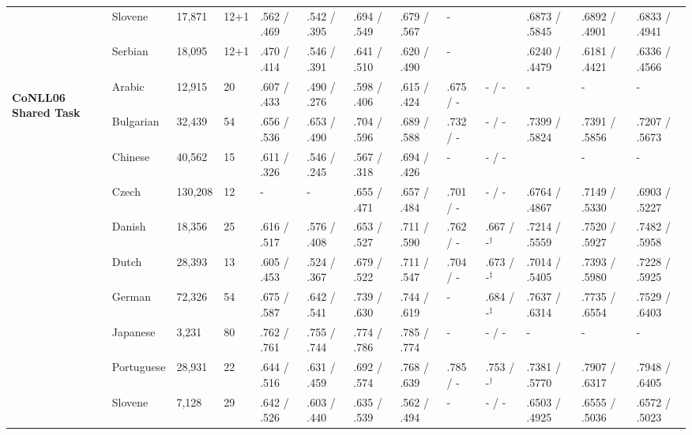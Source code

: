 \begin{landscape}
\begin{table}[ht]
\begin{tabular}{|l|l|l|l|p{1.5cm}|p{1.5cm}|p{1.5cm}|p{1.5cm}|p{1.5cm}|p{2cm}|p{2cm}|p{2cm}|p{2cm}|}
        & Slovene    & 17,871  & 12+1 & .562 / .469   & .542 / .395   & .694 / .549   & .679 / .567   & -         & & .6873 / .5845  & .6892 / .4901     & .6833 / .4941 \\
        & Serbian    & 18,095  & 12+1 & .470 / .414   & .546 / .391   & .641 / .510   & .620 / .490   & -         & & .6240 / .4479  & .6181 / .4421     & .6336 / .4566 \\
        \hline %
        \multirow{13}{*}{\begin{sideways}\textbf{CoNLL06 Shared Task}\end{sideways}}
        & Arabic       & 12,915  & 20   & .607 / .433   & .490 / .276   & .598 / .406   & .615 / .424   & .675 / - & - / -   & - & -               & -  \\
        & Bulgarian  & 32,439  & 54   & .656 / .536   & .653 / .490   & .704 / .596   & .689 / .588   & .732 / -   & - / -   & .7399 / .5824  & .7391 / .5856     & .7207 / .5673 \\
        & Chinese    & 40,562  & 15   & .611 / .326   & .546 / .245   & .567 / .318   & .694 / .426   & -          & - / -   & & -               & -           \\
        & Czech      & 130,208 & 12   & -             & -            & .655 / .471   & .657 / .484    & .701 / -   & - / -   & .6764 / .4867  & .7149 / .5330     & .6903 / .5227 \\
        & Danish     & 18,356  & 25   & .616 / .517   & .576 / .408   & .653 / .527   & .711 / .590   & .762 / -   & .667 / -$^\dagger$& .7214 / .5559  & .7520 / .5927     & .7482 / .5958 \\
        & Dutch      & 28,393  & 13   & .605 / .453   & .524 / .367   & .679 / .522   & .711 / .547   & .704 / -   & .673 / -$^\ddagger$& .7014 / .5405  & .7393 / .5980     & .7228 / .5925 \\
        & German     & 72,326  & 54   & .675 / .587   & .642 / .541   & .739 / .630   & .744 / .619   & -          & .684 / -$^\ddagger$& .7637 / .6314  & .7735 / .6554     & .7529 / .6403 \\
        & Japanese   & 3,231   & 80   & .762 / .761   & .755 / .744   & .774 / .786   & .785 / .774   & -          & - / -   & - & -               & -           \\
        & Portuguese & 28,931  & 22   & .644 / .516   & .631 / .459   & .692 / .574   & .768 / .639   & .785 / -   & .753 / -$^\dagger$& .7381 / .5770  & .7907 / .6317     & .7948 / .6405 \\
        & Slovene    & 7,128   & 29   & .642 / .526   & .603 / .440   & .635 / .539   & .562 / .494   & -          & - / -   & .6503 / .4925  & .6555 / .5036     & .6572 / .5023 \\

\end{tabular}
\end{table}
\end{landscape}
